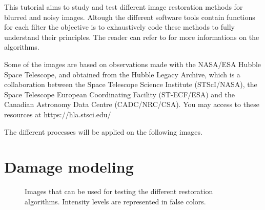 \def\difficulty{3}

\begin{note}This tutorial aims to study and test different image restoration methods for blurred and noisy images. Altough the different software tools contain functions for each filter 
the objective is to exhaustively code these methods to fully understand their principles. The reader can refer to \cite{Sage2017} for more informations on the algorithms.

Some of the images are based on observations made with the NASA/ESA Hubble Space Telescope, and obtained from the Hubble Legacy Archive, which is a collaboration between the Space Telescope Science Institute (STScI/NASA), the Space Telescope European Coordinating Facility (ST-ECF/ESA) and the Canadian Astronomy Data Centre (CADC/NRC/CSA). You may access to these resources at https://hla.stsci.edu/
\end{note}


\noindent The different processes will be applied on the following images.

\section{Damage modeling}
\begin{figure}[htbp]\caption{Images that can be used for testing the different restoration algorithms. Intensity levels are represented in false colors.}%
\begin{center}
	\vspace*{5pt}
\hspace{1cm}

\hspace{1cm}
\vspace*{-10pt}
\end{center}
\end{figure}

